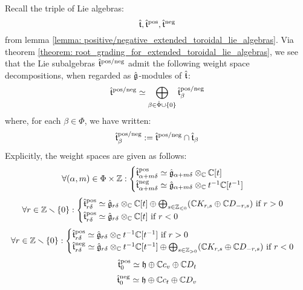         \begin{corollary}
            Recall the triple of Lie algebras:
                $$\hat{\mathfrak{t}}, \hat{\mathfrak{t}}^{\mathrm{pos}}, \hat{\mathfrak{t}}^{\mathrm{neg}}$$
            from lemma \ref{lemma: positive/negative_extended_toroidal_lie_algebras}. Via theorem \ref{theorem: root_grading_for_extended_toroidal_lie_algebras}, we see that the Lie subalgebras $\hat{\mathfrak{t}}^{\mathrm{pos}/\mathrm{neg}}$ admit the following weight space decompositions, when regarded as $\hat{\mathfrak{g}}$-modules of $\hat{\mathfrak{t}}$:
                $$\hat{\mathfrak{t}}^{\mathrm{pos}/\mathrm{neg}} \simeq \bigoplus_{\beta \in \hat{\Phi} \cup \{0\}} \hat{\mathfrak{t}}^{\mathrm{pos}/\mathrm{neg}}_{\beta}$$
            where, for each $\beta \in \hat{\Phi}$, we have written:
                $$\hat{\mathfrak{t}}^{\mathrm{pos}/\mathrm{neg}}_{\beta} := \hat{\mathfrak{t}}^{\mathrm{pos}/\mathrm{neg}} \cap \hat{\mathfrak{t}}_{\beta}$$
            Explicitly, the weight spaces are given as follows:
                $$
                    \forall (\alpha, m) \in \Phi \x \Z:
                    \begin{cases}
                        \extendedtoroidal^{\positive}_{\alpha + m\delta} \cong \hat{\g}_{\alpha + m\delta} \tensor_{\bbC} \bbC[t]
                        \\
                        \extendedtoroidal^{\negative}_{\alpha + m\delta} \cong \hat{\g}_{\alpha + m\delta} \tensor_{\bbC} t^{-1}\bbC[t^{-1}]
                    \end{cases}
                $$
                $$
                    \forall r \in \Z \setminus \{0\}:
                    \begin{cases}
                        \text{$\extendedtoroidal^{\positive}_{r\delta} \cong \hat{\g}_{r\delta} \tensor_{\bbC} \bbC[t] \oplus \bigoplus_{s \in \Z_{\leq 0}} (\bbC K_{r, s} \oplus \bbC D_{-r, s})$ if $r > 0$}
                        \\
                        \text{$\extendedtoroidal^{\positive}_{r\delta} \cong \hat{\g}_{r\delta} \tensor_{\bbC} \bbC[t]$ if $r < 0$}
                    \end{cases}
                $$
                $$
                    \forall r \in \Z \setminus \{0\}:
                    \begin{cases}
                        \text{$\extendedtoroidal^{\positive}_{r\delta} \cong \hat{\g}_{r\delta} \tensor_{\bbC} t^{-1}\bbC[t^{-1}]$ if $r > 0$}
                        \\
                        \text{$\extendedtoroidal^{\negative}_{r\delta} \cong \hat{\g}_{r\delta} \tensor_{\bbC} t^{-1}\bbC[t^{-1}] \oplus \bigoplus_{s \in \Z_{> 0}} (\bbC K_{r, s} \oplus \bbC D_{-r, s})$ if $r < 0$}
                    \end{cases}
                $$
                $$\hat{\mathfrak{t}}^{\mathrm{pos}}_0 \simeq \mathfrak{h} \oplus \mathbb{C} c_v \oplus \mathbb{C} D_t$$
                $$\hat{\mathfrak{t}}^{\mathrm{neg}}_0 \simeq \mathfrak{h} \oplus \mathbb{C} c_t \oplus \mathbb{C} D_v$$
        \end{corollary}
        
